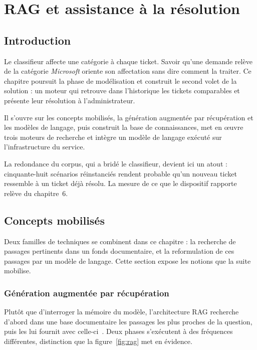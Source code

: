 \chapter{RAG et assistance à la résolution}

\section*{Introduction}

Le classifieur affecte une catégorie à chaque ticket. Savoir qu'une demande relève de la catégorie
\emph{Microsoft} oriente son affectation sans dire comment la traiter. Ce chapitre poursuit la phase
de modélisation et construit le second volet de la solution : un moteur qui retrouve dans
l'historique les tickets comparables et présente leur résolution à l'administrateur.

Il s'ouvre sur les concepts mobilisés, la génération augmentée par récupération et les modèles de
langage, puis construit la base de connaissances, met en œuvre trois moteurs de recherche et intègre
un modèle de langage exécuté sur l'infrastructure du service.

La redondance du corpus, qui a bridé le classifieur, devient ici un atout : cinquante-huit scénarios
réinstanciés rendent probable qu'un nouveau ticket ressemble à un ticket déjà résolu. La mesure de
ce que le dispositif rapporte relève du chapitre~6.

\section{Concepts mobilisés}

Deux familles de techniques se combinent dans ce chapitre : la recherche de passages pertinents
dans un fonds documentaire, et la reformulation de ces passages par un modèle de langage. Cette
section expose les notions que la suite mobilise.

\subsection{Génération augmentée par récupération}

Plutôt que d'interroger la mémoire du modèle, l'architecture RAG recherche d'abord dans une base
documentaire les passages les plus proches de la question, puis les lui fournit avec
celle-ci~\cite{lewis2020}. Deux phases s'exécutent à des fréquences différentes, distinction que la
figure~\ref{fig:rag} met en évidence.

